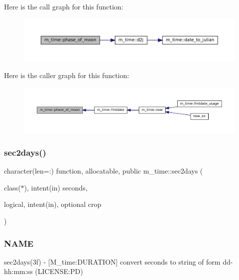 Here is the call graph for this function\+:\nopagebreak
\begin{figure}[H]
\begin{center}
\leavevmode
\includegraphics[width=350pt]{namespacem__time_ab8a976e2f113cc38b6df80974cee55dc_cgraph}
\end{center}
\end{figure}
Here is the caller graph for this function\+:\nopagebreak
\begin{figure}[H]
\begin{center}
\leavevmode
\includegraphics[width=350pt]{namespacem__time_ab8a976e2f113cc38b6df80974cee55dc_icgraph}
\end{center}
\end{figure}
\mbox{\label{namespacem__time_a7788285d79b8d58323b05e9a30a2d992}} 
\subsubsection{\texorpdfstring{sec2days()}{sec2days()}}
{\footnotesize\ttfamily character(len=\+:) function, allocatable, public m\+\_\+time\+::sec2days (\begin{DoxyParamCaption}\item[{class($\ast$), intent(in)}]{seconds,  }\item[{logical, intent(in), optional}]{crop }\end{DoxyParamCaption})}



\subsubsection*{N\+A\+ME}

sec2days(3f) -\/ \mbox{[}M\+\_\+time\+:D\+U\+R\+A\+T\+I\+ON\mbox{]} convert seconds to string of form dd-\/hh\+:mm\+:ss (L\+I\+C\+E\+N\+SE\+:PD) 


